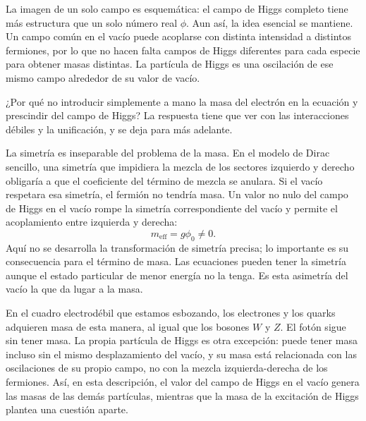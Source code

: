 La imagen de un solo campo es esquemática: el campo de Higgs completo tiene más estructura que un solo número real \(\phi\). Aun así, la idea esencial se mantiene. Un campo común en el vacío puede acoplarse con distinta intensidad a distintos fermiones, por lo que no hacen falta campos de Higgs diferentes para cada especie para obtener masas distintas. La partícula de Higgs es una oscilación de ese mismo campo alrededor de su valor de vacío.

¿Por qué no introducir simplemente a mano la masa del electrón en la ecuación y prescindir del campo de Higgs? La respuesta tiene que ver con las interacciones débiles y la unificación, y se deja para más adelante.

\begin{classroomqa}
\end{classroomqa}

\begin{classroomqa}
\end{classroomqa}

La simetría es inseparable del problema de la masa. En el modelo de Dirac sencillo, una simetría que impidiera la mezcla de los sectores izquierdo y derecho obligaría a que el coeficiente del término de mezcla se anulara. Si el vacío respetara esa simetría, el fermión no tendría masa. Un valor no nulo del campo de Higgs en el vacío rompe la simetría correspondiente del vacío y permite el acoplamiento entre izquierda y derecha:
\begin{equation}
m_{\mathrm{eff}}=g\phi_0\neq0.
\end{equation}
Aquí no se desarrolla la transformación de simetría precisa; lo importante es su consecuencia para el término de masa. Las ecuaciones pueden tener la simetría aunque el estado particular de menor energía no la tenga. Es esta asimetría del vacío la que da lugar a la masa.

En el cuadro electrodébil que estamos esbozando, los electrones y los quarks adquieren masa de esta manera, al igual que los bosones \(W\) y \(Z\). El fotón sigue sin tener masa. La propia partícula de Higgs es otra excepción: puede tener masa incluso sin el mismo desplazamiento del vacío, y su masa está relacionada con las oscilaciones de su propio campo, no con la mezcla izquierda-derecha de los fermiones. Así, en esta descripción, el valor del campo de Higgs en el vacío genera las masas de las demás partículas, mientras que la masa de la excitación de Higgs plantea una cuestión aparte.

